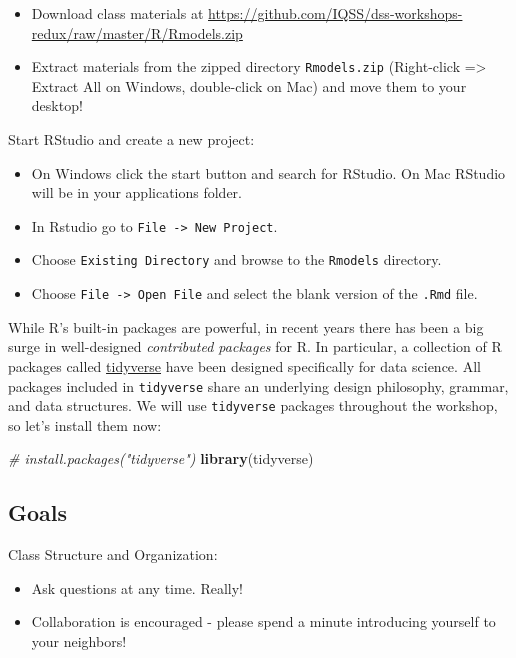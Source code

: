 \documentclass[]{book}
\newenvironment{Shaded}{\begin{snugshade}}{\end{snugshade}}
\newcommand{\KeywordTok}[1]{\textcolor[rgb]{0.13,0.29,0.53}{\textbf{#1}}}
\newcommand{\CommentTok}[1]{\textcolor[rgb]{0.56,0.35,0.01}{\textit{#1}}}
\newcommand{\NormalTok}[1]{#1}
\providecommand{\tightlist}{%
  \setlength{\itemsep}{0pt}\setlength{\parskip}{0pt}}
\begin{document}
\begin{itemize}
\tightlist
\item
  Download class materials at
  \url{https://github.com/IQSS/dss-workshops-redux/raw/master/R/Rmodels.zip}
\item
  Extract materials from the zipped directory \texttt{Rmodels.zip}
  (Right-click =\textgreater{} Extract All on Windows, double-click on
  Mac) and move them to your desktop!
\end{itemize}

Start RStudio and create a new project:

\begin{itemize}
\tightlist
\item
  On Windows click the start button and search for RStudio. On Mac
  RStudio will be in your applications folder.
\item
  In Rstudio go to \texttt{File\ -\textgreater{}\ New\ Project}.
\item
  Choose \texttt{Existing\ Directory} and browse to the \texttt{Rmodels}
  directory.
\item
  Choose \texttt{File\ -\textgreater{}\ Open\ File} and select the blank
  version of the \texttt{.Rmd} file.
\end{itemize}

While R's built-in packages are powerful, in recent years there has been
a big surge in well-designed \emph{contributed packages} for R. In
particular, a collection of R packages called
\href{https://www.tidyverse.org/}{tidyverse} have been designed
specifically for data science. All packages included in
\texttt{tidyverse} share an underlying design philosophy, grammar, and
data structures. We will use \texttt{tidyverse} packages throughout the
workshop, so let's install them now:

\begin{Shaded}
\begin{Highlighting}[]
\CommentTok{# install.packages("tidyverse")}
\KeywordTok{library}\NormalTok{(tidyverse)}
\end{Highlighting}
\end{Shaded}

\subsection{Goals}\label{goals-1}

Class Structure and Organization:

\begin{itemize}
\tightlist
\item
  Ask questions at any time. Really!
\item
  Collaboration is encouraged - please spend a minute introducing
  yourself to your neighbors!
\end{itemize}
\end{document}
